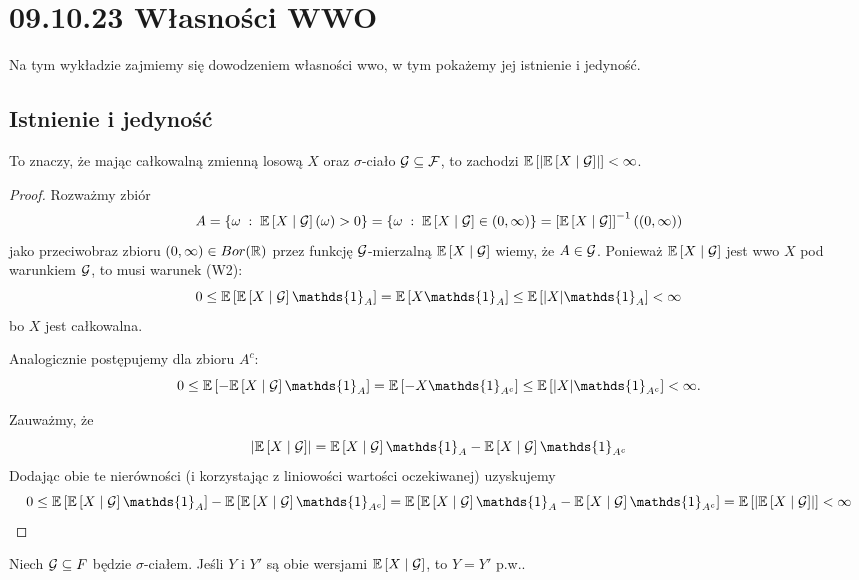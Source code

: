 \section{09.10.23 Własności WWO}

Na tym wykładzie zajmiemy się dowodzeniem własności wwo, w tym pokażemy jej istnienie i jedyność.

\subsection{Istnienie i jedyność}

\begin{lemma}
  To znaczy, że mając całkowalną zmienną losową $X$ oraz $\sigma$-ciało $\mathcal{G}\subseteq\mathcal{F}$, to zachodzi $\expected{\left|\expected{X}{\set{G}}\right|}<\infty$.
\end{lemma}

\begin{proof}
  Rozważmy zbiór
  $$A=\{\omega\;:\;\expected{X}{\set{G}}(\omega)>0\}=\{\omega\;:\;\expected{X}{\set{G}}\in(0, \infty)\}=\left[\expected{X}{\set{G}}\right]^{-1}((0,\infty))$$
  jako przeciwobraz zbioru $(0,\infty)\in Bor(\operatorname{\mathbb{R}})$ przez funkcję $\mathcal{G}$-mierzalną $\expected{X}{\set{G}}$ wiemy, że $A\in \mathcal{G}$. Ponieważ $\expected{X}{\set{G}}$ jest wwo $X$ pod warunkiem $\mathcal{G}$, to musi warunek (W2): $$0\leq\expected{\expected{X}{\set{G}}\mathds{1}_A}=\expected{X\mathds{1}_A}\leq\expected{|X|\mathds{1}_A}<\infty$$
  bo $X$ jest całkowalna.

  Analogicznie postępujemy dla zbioru $A^c$:
  $$0\leq\expected{-\expected{X}{\set{G}}\mathds{1}_A}=\expected{-X\mathds{1}_{A^c}}\leq\expected{|X|\mathds{1}_{A^c}}<\infty.$$
  
  Zauważmy, że 
  $$\left|
    \expected{X}{\set{G}}
    \right| = \expected{X}{\set{G}}\mathds{1}_A-\expected{X}{\set{G}}\mathds{1}_{A^c}$$
  Dodając obie te nierówności (i korzystając z liniowości wartości oczekiwanej) uzyskujemy
  $$0\leq \expected{\expected{X}{\set{G}}\mathds{1}_A}-\expected{\expected{X}{\set{G}}\mathds{1}_{A^c}}=\expected{\expected{X}{\set{G}}\mathds{1}_A-\expected{X}{\set{G}}\mathds{1}_{A^c}}=\expected{\left|\expected{X}{\set{G}}\right|}<\infty$$
\end{proof}

\begin{lemma}[jedyność p.w.]
  Niech $\mathcal{G}\subseteq{F}$ będzie $\sigma$-ciałem. Jeśli $Y$ i $Y'$ są obie wersjami $\expected{X}{\set{G}}$, to $Y=Y'$ p.w..
\end{lemma}

